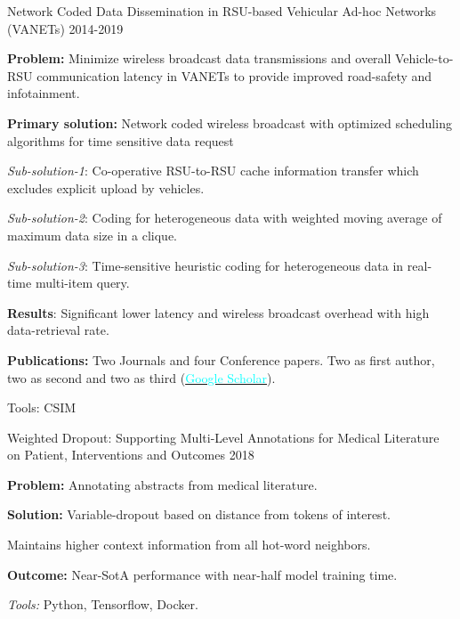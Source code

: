 \begin{cventries}
\cventry
  {} %
  {Network Coded Data Dissemination in RSU-based Vehicular Ad-hoc Networks (VANETs)} %
  {2014-2019} %
  {} %
  {
    \vspace{-3mm}
    \begin{cvitems} %
      \item {\textbf{Problem:} Minimize wireless broadcast data transmissions and overall Vehicle-to-RSU communication latency in VANETs to provide improved road-safety and infotainment.}
      \item {\textbf{Primary solution:} Network coded wireless broadcast with optimized scheduling algorithms for time sensitive data request}
      \item {\textit{Sub-solution-1}: Co-operative RSU-to-RSU cache information transfer which excludes explicit upload by vehicles.}
      \item {\textit{Sub-solution-2}: Coding for heterogeneous data with weighted moving average of maximum data size in a clique.}
      \item {\textit{Sub-solution-3}: Time-sensitive heuristic coding for heterogeneous data in real-time multi-item query.}
      \item {\textbf{Results}: Significant lower latency and wireless broadcast overhead with high data-retrieval rate.}
      \item {\textbf{Publications:} Two Journals and four Conference papers. Two as first author, two as second and two as third (\href{https://scholar.google.com/citations?user=hYY1wDEAAAAJ&hl=en}{\textcolor{cyan}{Google Scholar}}).}
      \item {Tools: CSIM}
    \end{cvitems}
  }
  {}

\cventry
    {}
    {Weighted Dropout: Supporting Multi-Level Annotations for Medical Literature on Patient, Interventions and Outcomes} %
    {2018} %
    {}
    {
      \vspace{-3mm}
      \begin{cvitems} %
        \item {\textbf{Problem:} Annotating abstracts from medical literature.}
        \item {\textbf{Solution:} Variable-dropout based on distance from tokens of interest.}
        \item {Maintains higher context information from all hot-word neighbors.}
        \item {\textbf{Outcome:} Near-SotA performance with near-half model training time.}
        \item {\textit{Tools:} Python, Tensorflow, Docker.}
      \end{cvitems}
    }
    {}


\end{cventries}
